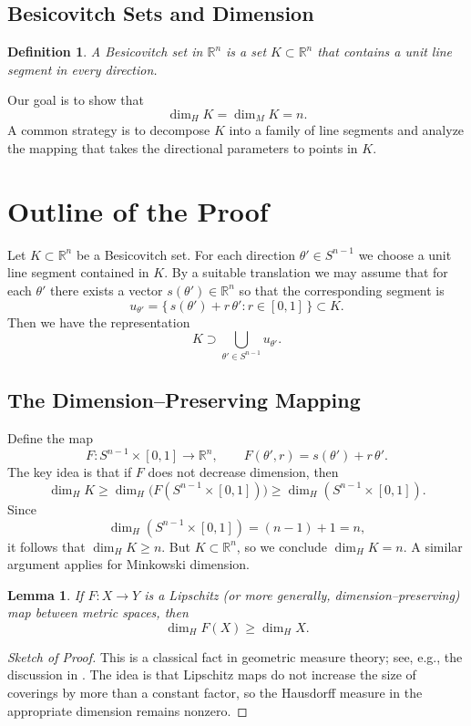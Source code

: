 \documentclass{amsart}
\newtheorem{lemma}[theorem]{Lemma}
\newtheorem{definition}[theorem]{Definition}
\begin{document}
\subsection{Besicovitch Sets and Dimension}
\begin{definition}
A \emph{Besicovitch set} in $\mathbb{R}^n$ is a set $K\subset\mathbb{R}^n$ that contains a unit line segment in every direction.
\end{definition}

Our goal is to show that 
\[
\dim_H K = \dim_M K = n.
\]
A common strategy is to decompose $K$ into a family of line segments and analyze the mapping that takes the directional parameters to points in $K$.

\section{Outline of the Proof}
Let $K\subset\mathbb{R}^n$ be a Besicovitch set. For each direction $\theta' \in S^{n-1}$ we choose a unit line segment contained in $K$. By a suitable translation we may assume that for each $\theta'$ there exists a vector $s(\theta')\in\mathbb{R}^n$ so that the corresponding segment is
\[
u_{\theta'} = \{\, s(\theta') + r\,\theta' : r\in[0,1] \,\} \subset K.
\]
Then we have the representation
\[
K \supset \bigcup_{\theta'\in S^{n-1}} u_{\theta'}.
\]

\subsection{The Dimension–Preserving Mapping}
Define the map
\[
F: S^{n-1}\times [0,1] \to \mathbb{R}^n,\qquad F(\theta',r)= s(\theta')+r\,\theta'.
\]
The key idea is that if $F$ does not decrease dimension, then
\[
\dim_H K \ge \dim_H\bigl(F(S^{n-1}\times[0,1])\bigr) \ge \dim_H (S^{n-1}\times[0,1]).
\]
Since 
\[
\dim_H (S^{n-1}\times[0,1]) = (n-1) + 1 = n,
\]
it follows that $\dim_H K \ge n$. But $K\subset\mathbb{R}^n$, so we conclude $\dim_H K = n$. A similar argument applies for Minkowski dimension.

\begin{lemma}\label{lem:dim_preserve}
If $F:X\to Y$ is a Lipschitz (or more generally, dimension–preserving) map between metric spaces, then
\[
\dim_H F(X) \ge \dim_H X.
\]
\end{lemma}

\begin{proof}[Sketch of Proof]
This is a classical fact in geometric measure theory; see, e.g., the discussion in \cite{Wolff1995}. The idea is that Lipschitz maps do not increase the size of coverings by more than a constant factor, so the Hausdorff measure in the appropriate dimension remains nonzero.
\end{proof}
\end{document}

